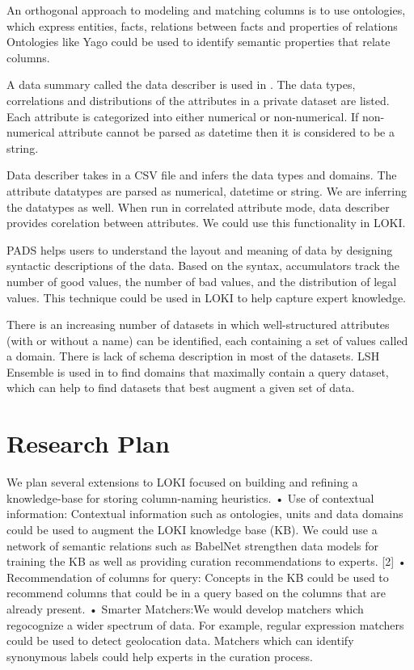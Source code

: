 \documentclass{vldb}
\begin{document}
An orthogonal approach to modeling and matching columns is to use ontologies, which express entities, facts, relations between facts and properties of relations
Ontologies like Yago \cite{fabian2007yago} could be used to identify semantic properties that relate columns.

A data summary called the data describer is used in \cite{ping2017datasynthesizer}. The data types, correlations and distributions of the attributes in a private dataset are listed. Each attribute is categorized into either numerical or non-numerical. If non-numerical attribute cannot be parsed as datetime then it is considered to be a string.

Data describer takes in a CSV file and infers the data types and domains. The attribute datatypes are parsed as numerical, datetime or string. We are inferring the datatypes as well. When run in correlated attribute mode, data describer provides corelation between attributes. We could use this functionality in LOKI.

PADS \cite{fisher2005pads} helps users to understand the layout and meaning of data by designing syntactic descriptions of the data.
Based on the syntax, accumulators track the number of good values, the number of bad values, and the distribution of legal values.
This technique could be used in LOKI to help capture expert knowledge.

There is an increasing number of datasets in which well-structured attributes
(with or without a name) can be identified, each containing a set of values called a domain. There is lack of schema description in most of the datasets.
LSH Ensemble is used in \cite{zhu2016lsh} to find domains that maximally contain a query dataset, which can help to find datasets that best augment a given set of data.

\section{Research Plan}
We plan several extensions to LOKI focused on building and
refining a knowledge-base for storing column-naming heuristics.
• Use of contextual information: Contextual information
such as ontologies, units and data domains could be used to augment
the LOKI knowledge base (KB). We could use a network of
semantic relations such as BabelNet strengthen data models for
training the KB as well as providing curation recommendations
to experts. [2] • Recommendation of columns for query: Concepts
in the KB could be used to recommend columns that could be
in a query based on the columns that are already present. • Smarter
Matchers:We would develop matchers which regocognize a wider
spectrum of data. For example, regular expression matchers could
be used to detect geolocation data. Matchers which can identify
synonymous labels could help experts in the curation process.
\end{document}
